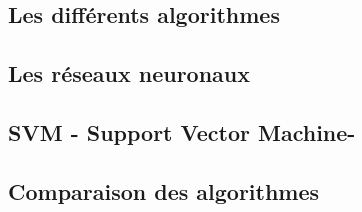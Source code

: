 \subsection{Les différents algorithmes}
\label{ILe Machine Learning: Les différents algorithmes: La regression logistique}

\subsection{Les réseaux neuronaux}
\label{ILe Machine Learning: Les différents algorithmes: Les réseaux neuronaux}

\subsection{SVM - Support Vector Machine-}
\label{ILe Machine Learning: Les différents algorithmes: SVM}

\subsection{Comparaison des algorithmes}
\label{ILe Machine Learning: Les différents algorithmes: Comparaison des algorithmes}